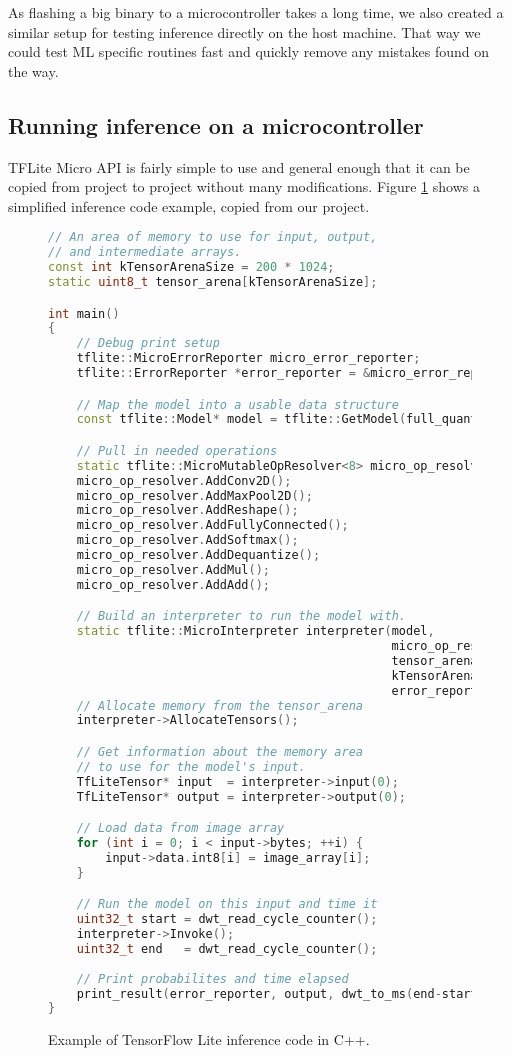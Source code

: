As flashing a big binary to a microcontroller takes a long time, we also created a similar setup for testing inference directly on the host machine.
That way we could test ML specific routines fast and quickly remove any mistakes found on the way.


\subsection{ Running inference on a microcontroller}

TFLite Micro API is fairly simple to use and general enough that it can be copied from project to project without many modifications.
Figure \ref{inference_code} shows a simplified inference code example, copied from our project.
\lstset{style=mystyle}
\begin{figure}[ht] 
    \begin{lstlisting}[language=C++]
// An area of memory to use for input, output, 
// and intermediate arrays.
const int kTensorArenaSize = 200 * 1024;
static uint8_t tensor_arena[kTensorArenaSize];

int main() 
{
    // Debug print setup
    tflite::MicroErrorReporter micro_error_reporter;
    tflite::ErrorReporter *error_reporter = &micro_error_reporter;

    // Map the model into a usable data structure
    const tflite::Model* model = tflite::GetModel(full_quant_tflite);

    // Pull in needed operations
    static tflite::MicroMutableOpResolver<8> micro_op_resolver;
    micro_op_resolver.AddConv2D();
    micro_op_resolver.AddMaxPool2D();
    micro_op_resolver.AddReshape();
    micro_op_resolver.AddFullyConnected();
    micro_op_resolver.AddSoftmax();
    micro_op_resolver.AddDequantize();
    micro_op_resolver.AddMul();
    micro_op_resolver.AddAdd();

    // Build an interpreter to run the model with.
    static tflite::MicroInterpreter interpreter(model, 
                                                micro_op_resolver, 
                                                tensor_arena,
                                                kTensorArenaSize, 
                                                error_reporter);
    // Allocate memory from the tensor_arena
    interpreter->AllocateTensors();

    // Get information about the memory area 
    // to use for the model's input.
    TfLiteTensor* input  = interpreter->input(0);
    TfLiteTensor* output = interpreter->output(0);

    // Load data from image array
    for (int i = 0; i < input->bytes; ++i) {
        input->data.int8[i] = image_array[i];
    }

    // Run the model on this input and time it
    uint32_t start = dwt_read_cycle_counter();
    interpreter->Invoke();
    uint32_t end   = dwt_read_cycle_counter();
    
    // Print probabilites and time elapsed
    print_result(error_reporter, output, dwt_to_ms(end-start));
}
    \end{lstlisting}
    \caption{ Example of TensorFlow Lite inference code in C++.}
    \label{inference_code}
\end{figure}
